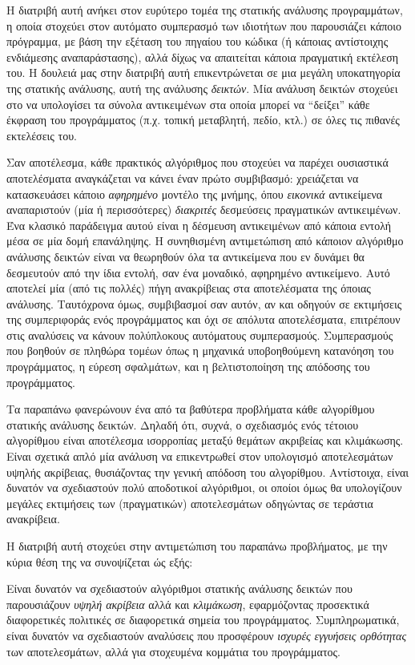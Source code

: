 Η διατριβή αυτή ανήκει στον ευρύτερο τομέα της στατικής ανάλυσης προγραμμάτων, η οποία στοχεύει στον αυτόματο συμπερασμό των ιδιοτήτων που παρουσιάζει κάποιο πρόγραμμα, με βάση την εξέταση του πηγαίου του κώδικα (ή κάποιας αντίστοιχης ενδιάμεσης αναπαράστασης), αλλά δίχως να απαιτείται κάποια πραγματική εκτέλεση του. Η δουλειά μας στην διατριβή αυτή επικεντρώνεται σε μια μεγάλη υποκατηγορία της στατικής ανάλυσης, αυτή της ανάλυσης \emph{δεικτών}. Μία ανάλυση δεικτών στοχεύει στο να υπολογίσει τα σύνολα αντικειμένων στα οποία μπορεί να ``δείξει'' κάθε έκφραση του προγράμματος (π.χ. τοπική μεταβλητή, πεδίο, κτλ.) σε όλες τις πιθανές εκτελέσεις του.

Σαν αποτέλεσμα, κάθε πρακτικός αλγόριθμος που στοχεύει να παρέχει ουσιαστικά αποτελέσματα αναγκάζεται να κάνει έναν πρώτο συμβιβασμό: χρειάζεται να κατασκευάσει κάποιο \emph{αφηρημένο} μοντέλο της μνήμης, όπου \emph{εικονικά} αντικείμενα αναπαριστούν (μία ή περισσότερες) \emph{διακριτές} δεσμεύσεις πραγματικών αντικειμένων. Ένα κλασικό παράδειγμα αυτού είναι η δέσμευση αντικειμένων από κάποια εντολή μέσα σε μία δομή επανάληψης. Η συνηθισμένη αντιμετώπιση από κάποιον αλγόριθμο ανάλυσης δεικτών είναι να θεωρηθούν όλα τα αντικείμενα που εν δυνάμει θα δεσμευτούν από την ίδια εντολή, σαν ένα μοναδικό, αφηρημένο αντικείμενο. Αυτό αποτελεί μία (από τις πολλές) πήγη ανακρίβειας στα αποτελέσματα της όποιας ανάλυσης. Ταυτόχρονα όμως, συμβιβασμοί σαν αυτόν, αν και οδηγούν σε εκτιμήσεις της συμπεριφοράς ενός προγράμματος και όχι σε απόλυτα αποτελέσματα, επιτρέπουν στις αναλύσεις να κάνουν πολύπλοκους αυτόματους συμπερασμούς. Συμπερασμούς που βοηθούν σε πληθώρα τομέων όπως η μηχανικά υποβοηθούμενη κατανόηση του προγράμματος, η εύρεση σφαλμάτων, και η βελτιστοποίηση της απόδοσης του προγράμματος.

Τα παραπάνω φανερώνουν ένα από τα βαθύτερα προβλήματα κάθε αλγορίθμου στατικής ανάλυσης δεικτών. Δηλαδή ότι, συχνά, ο σχεδιασμός ενός τέτοιου αλγορίθμου είναι αποτέλεσμα ισορροπίας μεταξύ θεμάτων ακριβείας και κλιμάκωσης. Είναι σχετικά απλό μία ανάλυση να επικεντρωθεί στον υπολογισμό αποτελεσμάτων υψηλής ακρίβειας, θυσιάζοντας την γενική απόδοση του αλγορίθμου. Αντίστοιχα, είναι δυνατόν να σχεδιαστούν πολύ αποδοτικοί αλγόριθμοι, οι οποίοι όμως θα υπολογίζουν μεγάλες εκτιμήσεις των (πραγματικών) αποτελεσμάτων οδηγώντας σε τεράστια ανακρίβεια.

Η διατριβή αυτή στοχεύει στην αντιμετώπιση του παραπάνω προβλήματος, με την κύρια θέση της να συνοψίζεται ώς εξής:

\begin{displayquote}
Είναι δυνατόν να σχεδιαστούν αλγόριθμοι στατικής ανάλυσης δεικτών που παρουσιάζουν \emph{υψηλή ακρίβεια} αλλά και \emph{κλιμάκωση}, εφαρμόζοντας προσεκτικά διαφορετικές πολιτικές σε διαφορετικά σημεία του προγράμματος. Συμπληρωματικά, είναι δυνατόν να σχεδιαστούν αναλύσεις που προσφέρουν \emph{ισχυρές εγγυήσεις ορθότητας} των αποτελεσμάτων, αλλά για στοχευμένα κομμάτια του προγράμματος.
\end{displayquote}

